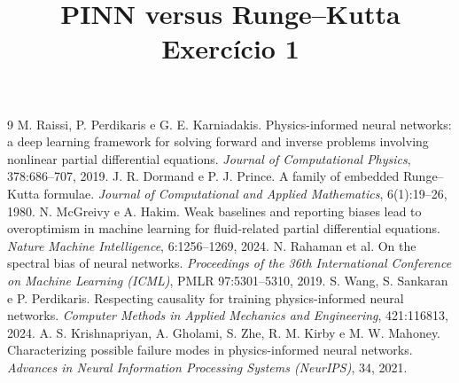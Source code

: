 \documentclass[11pt,a4paper]{article}
\title{PINN versus Runge--Kutta\\\large Exercício 1}
\author{}
\date{}
\begin{document}
\maketitle



\begin{thebibliography}{9}
 M. Raissi, P. Perdikaris e G. E. Karniadakis. Physics-informed neural networks: a deep learning
  framework for solving forward and inverse problems involving nonlinear partial differential equations.
  \emph{Journal of Computational Physics}, 378:686--707, 2019.
 J. R. Dormand e P. J. Prince. A family of embedded Runge--Kutta formulae.
  \emph{Journal of Computational and Applied Mathematics}, 6(1):19--26, 1980.
 N. McGreivy e A. Hakim. Weak baselines and reporting biases lead to overoptimism in machine
  learning for fluid-related partial differential equations. \emph{Nature Machine Intelligence}, 6:1256--1269, 2024.
 N. Rahaman et al. On the spectral bias of neural networks. \emph{Proceedings of the 36th
  International Conference on Machine Learning (ICML)}, PMLR 97:5301--5310, 2019.
 S. Wang, S. Sankaran e P. Perdikaris. Respecting causality for training physics-informed
  neural networks. \emph{Computer Methods in Applied Mechanics and Engineering}, 421:116813, 2024.
 A. S. Krishnapriyan, A. Gholami, S. Zhe, R. M. Kirby e M. W. Mahoney. Characterizing
  possible failure modes in physics-informed neural networks. \emph{Advances in Neural Information Processing Systems
  (NeurIPS)}, 34, 2021.
\end{thebibliography}
\end{document}
